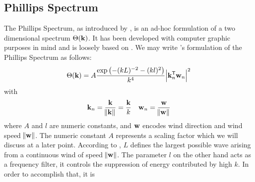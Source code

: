 \subsection{Phillips Spectrum}
\label{sec:phillips_spectrum}
%
The Phillips Spectrum, as introduced by \cite{course:simulatingocean},
is an ad-hoc formulation of a two dimensional \wavenumber spectrum $\Theta(\mathbf{k})$.
It has been developed with computer graphic purposes in mind and is loosely
based on \citet{article:Phillips1958,article:Phillips1985}.
We may write \citeauthor{course:simulatingocean}'s
formulation of the Phillips Spectrum as follows:
%
\begin{equation}
\label{eq:phillips_spectrum}
 \Theta(\mathbf{k}) = A\frac{\exp\left(-(kL)^{-2}-(kl)^2\right)}{k^4}\abs{\mathbf{k}_n^{\mathsf{T}}\mathbf{w}_n}^2
\end{equation}
with
\begin{align*}
 \mathbf{k}_n = \frac{\mathbf{k}}{\norm{\mathbf{k}}} = \frac{\mathbf{k}}{k} && \mathbf{w}_n = \frac{\mathbf{w}}{\norm{\mathbf{w}}}
\end{align*}
% 
% 
%
where $A$ and $l$ are numeric constants, and $\mathbf{w}$ encodes wind 
direction and wind speed $\norm{\mathbf{w}}$. The numeric constant $A$ represents 
a scaling factor which we will discuss at a later point.  According to 
\citeauthor{course:simulatingocean}, $L$ defines the largest possible wave
arising from a continuous wind of speed $\norm{\mathbf{w}}$. The parameter $l$ on 
the other hand acts as a frequency filter, it controls the suppression of energy
contributed by high \wavenumbers $k$. In order to accomplish that, it is
